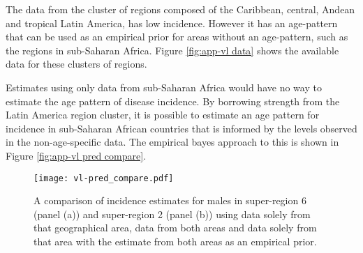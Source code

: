The data from the cluster of regions composed of the Caribbean,
central, Andean and tropical Latin America, has low incidence.
However it has an age-pattern that can be used as an empirical prior
for areas without an age-pattern, such as the regions in sub-Saharan
Africa.  Figure \ref{fig:app-vl data} shows the available data for
these clusters of regions.

Estimates using only data from sub-Saharan Africa would have no way to
estimate the age pattern of disease incidence. By borrowing strength
from the Latin America region cluster, it is possible to estimate an
age pattern for incidence in sub-Saharan African countries that is
informed by the levels observed in the non-age-specific data.  The
empirical bayes approach to this is shown in Figure \ref{fig:app-vl
  pred compare}.

    \begin{figure}[h]
        \begin{center}
            \texttt{[image: vl-pred\_compare.pdf]}
            \caption{A comparison of incidence estimates for males in
              super-region 6 (panel (a)) and super-region 2 (panel
              (b)) using data solely from that geographical area, data
              from both areas and data solely from that area with the
              estimate from both areas as an empirical prior.}
            \label{fig:app-vl pred compare}
        \end{center}
    \end{figure}
